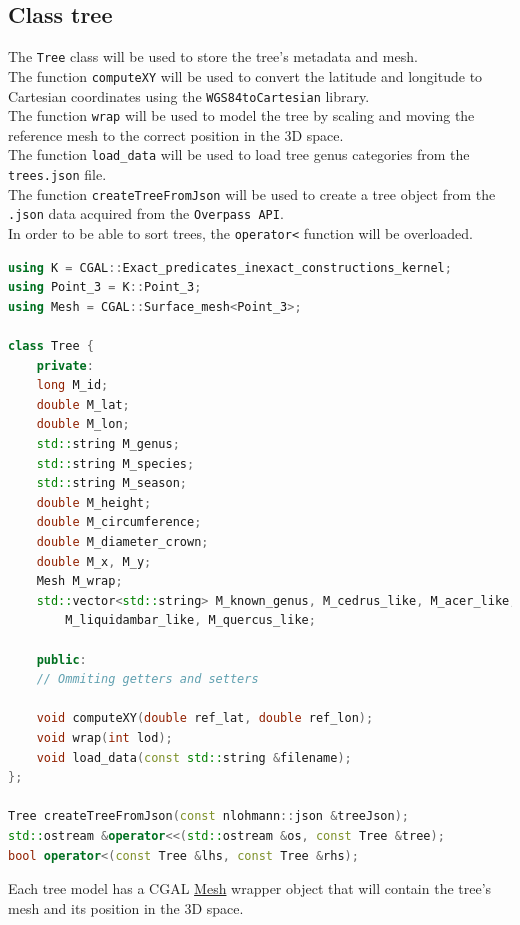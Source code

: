\documentclass[12pt]{article}
\begin{document}
\subsection{Class tree}

The \texttt{Tree} class will be used to store the tree's metadata and mesh. \\
The function \texttt{computeXY} will be used to convert the latitude and longitude
to Cartesian coordinates using the \texttt{WGS84toCartesian} library. \\
The function \texttt{wrap} will be used to model the tree by scaling and moving
the reference mesh to the correct position in the 3D space. \\
The function \texttt{load\_data} will be used to load tree genus categories from
the \texttt{trees.json} file. \\
The function \texttt{createTreeFromJson} will be used to create a tree object from
the \texttt{.json} data acquired from the \texttt{Overpass API}. \\
In order to be able to sort trees, the \texttt{operator<} function will be overloaded.


\begin{lstlisting}[language=C++]
using K = CGAL::Exact_predicates_inexact_constructions_kernel;
using Point_3 = K::Point_3;
using Mesh = CGAL::Surface_mesh<Point_3>;

class Tree {
    private:
    long M_id;
    double M_lat;
    double M_lon;
    std::string M_genus;
    std::string M_species;
    std::string M_season;
    double M_height;
    double M_circumference;
    double M_diameter_crown;
    double M_x, M_y;
    Mesh M_wrap;
    std::vector<std::string> M_known_genus, M_cedrus_like, M_acer_like,
        M_liquidambar_like, M_quercus_like;

    public:
    // Ommiting getters and setters

    void computeXY(double ref_lat, double ref_lon);
    void wrap(int lod);
    void load_data(const std::string &filename);
};

Tree createTreeFromJson(const nlohmann::json &treeJson);
std::ostream &operator<<(std::ostream &os, const Tree &tree);
bool operator<(const Tree &lhs, const Tree &rhs);
\end{lstlisting}

Each tree model has a CGAL \href{https://doc.cgal.org/latest/Surface_mesh/classCGAL_1_1Surface__mesh.html}{Mesh}
wrapper object that will contain the tree's
mesh and its position in the 3D space.
\end{document}
